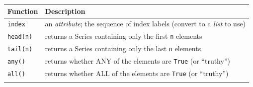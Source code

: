 \documentclass[]{book}
\begin{document}
\begin{longtable}[]{@{}ll@{}}
\toprule
\begin{minipage}[b]{0.05\columnwidth}\raggedright\strut
Function\strut
\end{minipage} & \begin{minipage}[b]{0.05\columnwidth}\raggedright\strut
Description\strut
\end{minipage}\tabularnewline
\midrule
\endhead
\begin{minipage}[t]{0.05\columnwidth}\raggedright\strut
\texttt{index}\strut
\end{minipage} & \begin{minipage}[t]{0.05\columnwidth}\raggedright\strut
an \emph{attribute}; the sequence of index labels (convert to a
\emph{list} to use)\strut
\end{minipage}\tabularnewline
\begin{minipage}[t]{0.05\columnwidth}\raggedright\strut
\texttt{head(n)}\strut
\end{minipage} & \begin{minipage}[t]{0.05\columnwidth}\raggedright\strut
returns a Series containing only the first \texttt{n} elements\strut
\end{minipage}\tabularnewline
\begin{minipage}[t]{0.05\columnwidth}\raggedright\strut
\texttt{tail(n)}\strut
\end{minipage} & \begin{minipage}[t]{0.05\columnwidth}\raggedright\strut
returns a Series containing only the last \texttt{n} elements\strut
\end{minipage}\tabularnewline
\begin{minipage}[t]{0.05\columnwidth}\raggedright\strut
\texttt{any()}\strut
\end{minipage} & \begin{minipage}[t]{0.05\columnwidth}\raggedright\strut
returns whether ANY of the elements are \texttt{True} (or
``truthy'')\strut
\end{minipage}\tabularnewline
\begin{minipage}[t]{0.05\columnwidth}\raggedright\strut
\texttt{all()}\strut
\end{minipage} & \begin{minipage}[t]{0.05\columnwidth}\raggedright\strut
returns whether ALL of the elements are \texttt{True} (or
``truthy'')\strut
\end{minipage}\tabularnewline
\begin{minipage}[t]{0.05\columnwidth}\raggedright\strut

\end{minipage}
\end{longtable}
\end{document}
